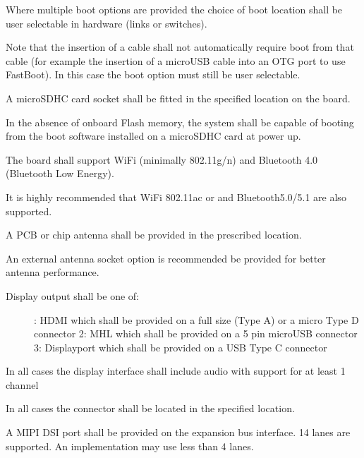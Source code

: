 \documentclass[a4paper,10pt,oneside,english]{sphinxmanual}
\begin{document}
\sphinxAtStartPar
Where multiple boot options are provided the choice of boot location shall be user selectable in hardware (links or switches).

\sphinxAtStartPar
Note that the insertion of a cable shall not automatically require boot from that cable (for example the insertion of a microUSB cable into an OTG port to use FastBoot). In this case the boot option must still be user selectable.

\sphinxAtStartPar
{}

\sphinxAtStartPar
A microSDHC card socket shall be fitted in the specified location on the board.

\sphinxAtStartPar
In the absence of on\sphinxhyphen{}board Flash memory, the system shall be capable of booting from the boot software installed on a microSDHC card at power up.

\sphinxAtStartPar
{}

\sphinxAtStartPar
The board shall support WiFi (minimally 802.11g/n) and Bluetooth 4.0 (Bluetooth Low Energy).

\sphinxAtStartPar
It is highly recommended that WiFi 802.11ac or  and Bluetooth5.0/5.1 are also supported.

\sphinxAtStartPar
A PCB or chip antenna shall be provided in the prescribed location.

\sphinxAtStartPar
An external antenna socket option is recommended be provided for better antenna performance.

\sphinxAtStartPar
{}
\begin{description}
\item[{Display output shall be one of:}] \leavevmode
{}: HDMI which shall be provided on a full size (Type A) or a micro Type D connector
2: MHL which shall be provided on a 5 pin microUSB connector
3: Displayport which shall be provided on a USB Type C connector

\end{description}

\sphinxAtStartPar
In all cases the display interface shall include audio with support for at least 1 channel

\sphinxAtStartPar
In all cases the connector shall be located in the specified location.

\sphinxAtStartPar
A MIPI DSI port shall be provided on the expansion bus interface.
1\sphinxhyphen{}4 lanes are supported. An implementation may use less than 4 lanes.
\end{document}
